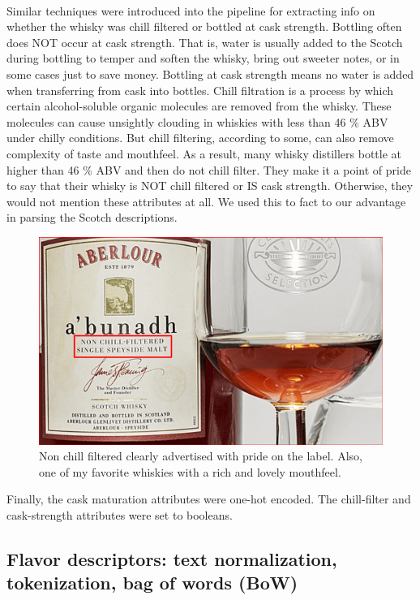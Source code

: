 \documentclass{article}
\begin{document}
 	 \paragraph{} Similar techniques were introduced into the pipeline for extracting info on whether the whisky was chill filtered or bottled at cask strength. Bottling often does NOT occur at cask strength. That is, water is usually added to the Scotch during bottling to temper and soften the whisky, bring out sweeter notes, or in some cases just to save money. Bottling at cask strength means no water is added when transferring from cask into bottles. Chill filtration is a process by which certain alcohol-soluble organic molecules are removed from the whisky. These molecules can cause unsightly clouding in whiskies with less than 46 \% ABV under chilly conditions. But chill filtering, according to some, can also remove complexity of taste and mouthfeel. As a result, many whisky distillers bottle at higher than 46 \% ABV and then do not chill filter. They make it a point of pride to say that their whisky is NOT chill filtered or IS cask strength. Otherwise, they would not mention these attributes at all. We used this to fact to our advantage in parsing the Scotch descriptions.
 	 	 \begin{figure}[H]
 	 	\begin{center}
 	 		\includegraphics[totalheight=6cm]{figures/onchillfilt.png}
 	 	\end{center}
 	 	\caption{Non chill filtered clearly advertised with pride on the label. Also, one of my favorite whiskies with a rich and lovely mouthfeel.}
 	 \end{figure}
 	 Finally, the cask maturation attributes were one-hot encoded. The chill-filter and cask-strength attributes were set to booleans.
 	 \subsection{Flavor descriptors: text normalization, tokenization, bag of words (BoW)}
\end{document}
